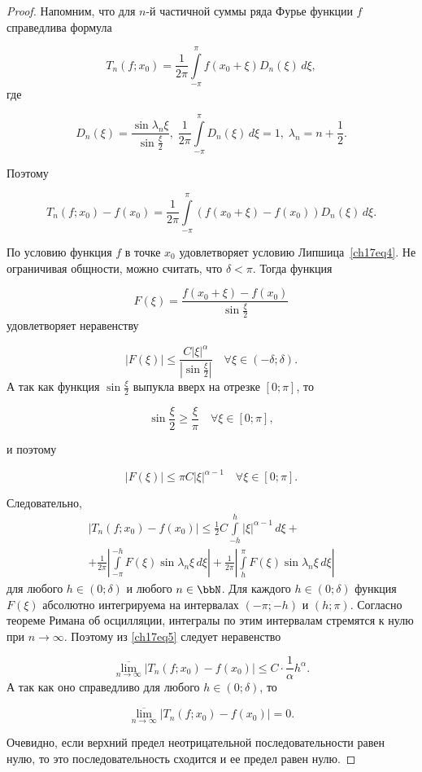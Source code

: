 \begin{proof}
Напомним, что для $n$-й частичной суммы ряда Фурье функции $f$ справедлива формула

$$
T_n(f;x_0) = \frac{1}{2\pi} \int\limits_{-\pi}^{\pi} f(x_0 + \xi) D_n(\xi) \,d\xi,
$$
где

$$
D_n(\xi) = \frac{\sin{\lambda_n \xi}}{\sin{\frac{\xi}{2}}}, \; \frac{1}{2\pi}\int\limits_{-\pi}^{\pi} D_n(\xi) \,d\xi = 1, \; \lambda_n = n + \frac12.
$$

Поэтому 

$$
T_n(f; x_0) - f(x_0) = \frac{1}{2\pi}\int\limits_{-\pi}^{\pi}(f(x_0 + \xi) - f(x_0))D_n(\xi)\,d\xi.
$$

По условию функция $f$ в точке $x_0$ удовлетворяет условию Липшица~\eqref{ch17eq4}. Не ограничивая общности, можно считать, что $\delta < \pi$. Тогда функция 

$$
F(\xi) = \frac{f(x_0 + \xi) - f(x_0)}{\sin{\frac{\xi}{2}}}
$$
удовлетворяет неравенству

$$
|F(\xi)| \le \frac{C|\xi|^\alpha}{\left| \sin{\frac{\xi}{2}} \right|} \quad \forall \xi \in (-\delta; \delta).
$$
А так как функция $\sin{\frac{\xi}{2}}$ выпукла вверх на отрезке $[0; \pi]$, то

$$
\sin{\frac{\xi}{2}} \ge \frac{\xi}{\pi} \quad \forall \xi \in [0; \pi],
$$

и поэтому 

$$
|F(\xi)| \le \pi C |\xi|^{\alpha - 1} \quad \forall \xi \in [0; \pi].
$$

Следовательно,
\begin{multline} \label{ch17eq5}
|T_n(f; x_0) - f(x_0)| \le \frac{1}{2} C \int\limits_{-h}^{h} |\xi|^{\alpha - 1}\,d\xi + \\
+ \frac{1}{2\pi} \left| \int\limits_{-\pi}^{-h} F(\xi) \sin{\lambda_n \xi} \,d\xi \right| + \frac{1}{2\pi} \left| \int\limits_{h}^{\pi} F(\xi) \sin{\lambda_n \xi} \,d\xi \right|
\end{multline}
для любого $h \in (0; \delta)$ и любого $n \in \bbN$. Для каждого $h \in (0;\delta)$ функция $F(\xi)$ абсолютно интегрируема на интервалах $(-\pi; -h)$ и $(h; \pi)$. Согласно теореме Римана об осцилляции, интегралы по этим интервалам стремятся к нулю при $n \to \infty$. Поэтому из \eqref{ch17eq5} следует неравенство

$$
\overline{\lim\limits_{n \to \infty}}|T_n(f; x_0) - f(x_0)| \le C \cdot \frac{1}{\alpha}h^{\alpha}.
$$
А так как оно справедливо для любого $h \in (0; \delta)$, то 

$$
\overline{\lim\limits_{n \to \infty}}|T_n(f; x_0) - f(x_0)| = 0.
$$

Очевидно, если верхний предел неотрицательной последовательности равен нулю, то это последовательность сходится и ее предел равен нулю.
\end{proof}


